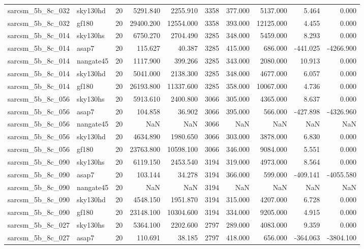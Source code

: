 \begin{longtable}{llrrrrrrrr}
sarcsm\_5b\_8c\_032 & sky130hd & 20 & 5291.840 & 2255.910 & 3358 & 377.000 & 5137.000 & 5.464 & 0.000 \\
sarcsm\_5b\_8c\_032 & gf180 & 20 & 29400.200 & 12554.000 & 3358 & 393.000 & 12125.000 & 4.455 & 0.000 \\
sarcsm\_5b\_8c\_014 & sky130hs & 20 & 6750.270 & 2704.490 & 3285 & 348.000 & 5459.000 & 8.293 & 0.000 \\
sarcsm\_5b\_8c\_014 & asap7 & 20 & 115.627 & 40.387 & 3285 & 415.000 & 686.000 & -441.025 & -4266.900 \\
sarcsm\_5b\_8c\_014 & nangate45 & 20 & 1117.900 & 399.266 & 3285 & 343.000 & 2080.000 & 10.913 & 0.000 \\
sarcsm\_5b\_8c\_014 & sky130hd & 20 & 5041.000 & 2138.300 & 3285 & 348.000 & 4677.000 & 6.057 & 0.000 \\
sarcsm\_5b\_8c\_014 & gf180 & 20 & 26193.800 & 11337.600 & 3285 & 358.000 & 10067.000 & 4.736 & 0.000 \\
sarcsm\_5b\_8c\_056 & sky130hs & 20 & 5913.610 & 2400.800 & 3066 & 305.000 & 4365.000 & 8.637 & 0.000 \\
sarcsm\_5b\_8c\_056 & asap7 & 20 & 104.858 & 36.902 & 3066 & 395.000 & 566.000 & -427.898 & -4326.960 \\
sarcsm\_5b\_8c\_056 & nangate45 & 20 & NaN & NaN & 3066 & NaN & NaN & NaN & NaN \\
sarcsm\_5b\_8c\_056 & sky130hd & 20 & 4634.890 & 1980.650 & 3066 & 303.000 & 3878.000 & 6.830 & 0.000 \\
sarcsm\_5b\_8c\_056 & gf180 & 20 & 23763.800 & 10598.100 & 3066 & 346.000 & 9084.000 & 5.551 & 0.000 \\
sarcsm\_5b\_8c\_090 & sky130hs & 20 & 6119.150 & 2453.540 & 3194 & 319.000 & 4973.000 & 8.564 & 0.000 \\
sarcsm\_5b\_8c\_090 & asap7 & 20 & 103.144 & 34.278 & 3194 & 366.000 & 599.000 & -409.141 & -4055.580 \\
sarcsm\_5b\_8c\_090 & nangate45 & 20 & NaN & NaN & 3194 & NaN & NaN & NaN & NaN \\
sarcsm\_5b\_8c\_090 & sky130hd & 20 & 4548.150 & 1951.870 & 3194 & 315.000 & 4207.000 & 6.728 & 0.000 \\
sarcsm\_5b\_8c\_090 & gf180 & 20 & 23148.100 & 10304.600 & 3194 & 334.000 & 9205.000 & 4.915 & 0.000 \\
sarcsm\_5b\_8c\_027 & sky130hs & 20 & 5364.100 & 2202.600 & 2797 & 289.000 & 4083.000 & 9.359 & 0.000 \\
sarcsm\_5b\_8c\_027 & asap7 & 20 & 110.691 & 38.185 & 2797 & 418.000 & 656.000 & -364.063 & -3804.100 \\

\end{longtable}
